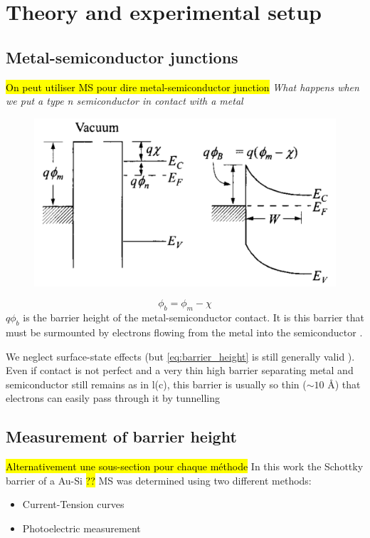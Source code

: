 \section{Theory and experimental setup}
\subsection{Metal-semiconductor junctions}
\hl{On peut utiliser MS pour dire metal-semiconductor junction}
\emph{What happens when we put a type n semiconductor in contact with a metal}
\begin{figure}[h]
    \centering
    \includegraphics[width=12cm]{figures/schottky_barrier.png}
    \caption{}
    \label{fig:schottky_barrier}
\end{figure}
\begin{equation} \label{eq:barrier_height}
    \phi_b = \phi_m - \chi
\end{equation}
$q \phi_b$ is the barrier height of the metal-semiconductor contact.
It is this barrier that must be surmounted by electrons flowing from the metal into the semiconductor \cite{sze_physics_2007}.

We neglect surface-state effects (but \autoref{eq:barrier_height} is still generally valid \cite{sze_physics_2007}).
Even if contact is not perfect and a very
thin high barrier separating metal and semiconductor still remains as in l(c), this barrier is usually so thin ($\sim 10$ \AA) that electrons can easily pass through it by tunnelling \cite{rhoderick_physics_1970}


\subsection{Measurement of barrier height}
\hl{Alternativement une sous-section pour chaque méthode}
In this work the Schottky barrier of a Au-Si \hl{??} MS was determined using two different methods:
\begin{itemize}
    \item Current-Tension curves
    \item Photoelectric measurement
\end{itemize}


